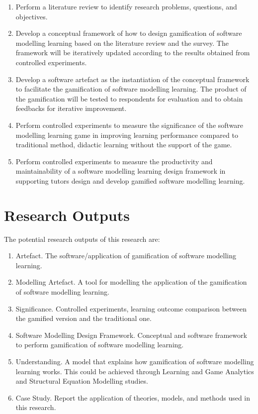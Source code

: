 \documentclass[12pt, a4paper]{report}
\begin{document}
\begin{enumerate}
\item Perform a literature review to identify research problems, questions, and objectives. 
\item Develop a conceptual framework of how to design gamification of software modelling learning based on the literature review and the survey. The framework will be iteratively updated according to the results obtained from controlled experiments. 
\item Develop a software artefact as the instantiation of the conceptual framework to facilitate the gamification of software modelling learning. The product of the gamification will be tested to respondents for evaluation and to obtain feedbacks for iterative improvement. 
\item Perform controlled experiments to measure the significance of the software modelling learning game in improving learning performance compared to traditional method, didactic learning without the support of the game.
\item Perform controlled experiments to measure the productivity and maintainability of a software modelling learning design framework in supporting tutors design and develop gamified software modelling learning. 
\end{enumerate}

\section{Research Outputs}
The potential research outputs of this research are:
\begin{enumerate}
\item Artefact. The software/application of gamification of software modelling learning.
\item Modelling Artefact. A tool for modelling the application of the gamification of software modelling learning.
\item Significance. Controlled experiments, learning outcome comparison between the gamified version and the traditional one.
\item Software Modelling Design Framework. Conceptual and software framework to perform gamification of software modelling learning.
\item Understanding. A model that explains how gamification of software modelling learning works.
This could be achieved through Learning and Game Analytics and Structural Equation Modelling studies.
\item Case Study. Report the application of theories, models, and methods used in this research.
\end{enumerate}
\end{document}
